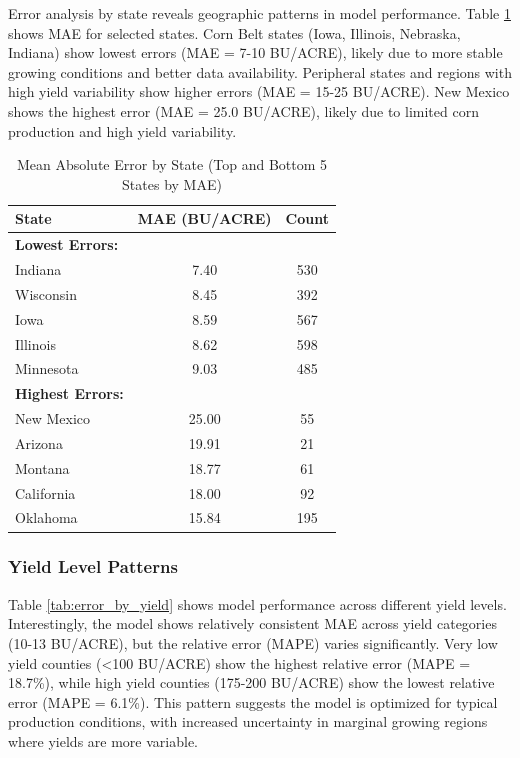 \documentclass[conference]{IEEEtran}
\begin{document}
Error analysis by state reveals geographic patterns in model performance. Table \ref{tab:error_by_state} shows MAE for selected states. Corn Belt states (Iowa, Illinois, Nebraska, Indiana) show lowest errors (MAE = 7-10 BU/ACRE), likely due to more stable growing conditions and better data availability. Peripheral states and regions with high yield variability show higher errors (MAE = 15-25 BU/ACRE). New Mexico shows the highest error (MAE = 25.0 BU/ACRE), likely due to limited corn production and high yield variability.

\begin{table}[htbp]
\caption{Mean Absolute Error by State (Top and Bottom 5 States by MAE)}
\label{tab:error_by_state}
\centering
\begin{tabular}{lcc}
\toprule
State & MAE (BU/ACRE) & Count \\
\midrule
\textbf{Lowest Errors:} & & \\
Indiana & 7.40 & 530 \\
Wisconsin & 8.45 & 392 \\
Iowa & 8.59 & 567 \\
Illinois & 8.62 & 598 \\
Minnesota & 9.03 & 485 \\
\midrule
\textbf{Highest Errors:} & & \\
New Mexico & 25.00 & 55 \\
Arizona & 19.91 & 21 \\
Montana & 18.77 & 61 \\
California & 18.00 & 92 \\
Oklahoma & 15.84 & 195 \\
\bottomrule
\end{tabular}
\end{table}

\subsubsection{Yield Level Patterns}

Table \ref{tab:error_by_yield} shows model performance across different yield levels. Interestingly, the model shows relatively consistent MAE across yield categories (10-13 BU/ACRE), but the relative error (MAPE) varies significantly. Very low yield counties (<100 BU/ACRE) show the highest relative error (MAPE = 18.7\%), while high yield counties (175-200 BU/ACRE) show the lowest relative error (MAPE = 6.1\%). This pattern suggests the model is optimized for typical production conditions, with increased uncertainty in marginal growing regions where yields are more variable.
\end{document}
